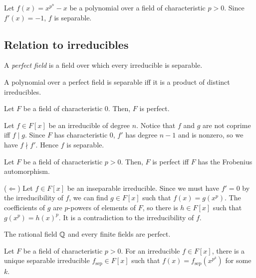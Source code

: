 \documentclass{../note}
\newcommand{\sep}{\mathrm{sep}}
\begin{document}
\begin{ex}
Let $f(x)=x^{p^n}-x$ be a polynomial over a field of characteristic $p>0$.
Since $f'(x)=-1$, $f$ is separable.
\end{ex}

\subsection{Relation to irreducibles}

\begin{defn}
A \emph{perfect field} is a field over which every irreducible is separable.
\end{defn}
\begin{cor}
A polynomial over a perfect field is separable iff it is a product of distinct irreducibles.
\end{cor}

\begin{prop}
Let $F$ be a field of characteristic $0$.
Then, $F$ is perfect.
\end{prop}
\begin{pf}
Let $f\in F[x]$ be an irreducible of degree $n$.
Notice that $f$ and $g$ are not coprime iff $f\mid g$.
Since $F$ has characteristic 0, $f'$ has degree $n-1$ and is nonzero, so we have $f\nmid f'$.
Hence $f$ is separable.
\end{pf}

\begin{prop}
Let $F$ be a field of characteristic $p>0$.
Then, $F$ is perfect iff $F$ has the Frobenius automorphism.
\end{prop}
\begin{pf}
($\Leftarrow$)
Let $f\in F[x]$ be an inseparable irreducible.
Since we must have $f'=0$ by the irreducibility of $f$, we can find $g\in F[x]$ such that $f(x)=g(x^p)$.
The coefficients of $g$ are $p$-powers of elements of $F$, so there is $h\in F[x]$ such that $g(x^p)=h(x)^p$.
It is a contradiction to the irreducibility of $f$.
\end{pf}

\begin{cor}
The rational field $\mathbb{Q}$ and every finite fields are perfect.
\end{cor}
\begin{prop}
Let $F$ be a field of characteristic $p>0$.
For an irreducible $f\in F[x]$, there is a unique separable irreducible $f_\sep\in F[x]$ such that $f(x)=f_\sep(x^{p^k})$ for some $k$.
\end{prop}
\end{document}
